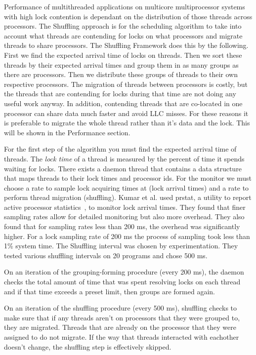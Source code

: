 \documentclass{sig-alternate}
\begin{document}
Performance of multithreaded applications on multicore multiprocessor systems with high lock contention is dependant on the distribution of those threads across processors. The Shuffling approach is for the scheduling algorithm to take into account what threads are contending for locks on what processors and migrate threads to share processors. The Shuffling Framework does this by the following. First we find the expected arrival time of locks on threads. Then we sort these threads by their expected arrival times and group them in as many groups as there are processors. Then we distribute these groups of threads to their own respective processors. The migration of threads between processors is costly, but the threads that are contending for locks during that time are not doing any useful work anyway. In addition, contending threads that are co-located in one processor can share data much faster and avoid LLC misses. For these reasons it is preferable to migrate the whole thread rather than it's data and the lock. This will be shown in the Performance section.~\cite{KumarEtal:2014}

For the first step of the algorithm you must find the expected arrival time of threads. The \textit{lock time} of a thread is measured by the percent of time it spends waiting for locks. There exists a daemon thread that contains a data structure that maps threads to their lock times and processor ids. For the monitor we must choose a rate to sample lock acquiring times at (lock arrival times) and a rate to perform thread migration (shuffling). Kumar et al. used prstat, a utility to report active processor statistics~\cite{prstat}, to monitor lock arrival times. They found that finer sampling rates allow for detailed monitoring but also more overhead. They also found that for sampling rates less than 200 ms, the overhead was significantly higher. For a lock sampling rate of 200 ms the process of sampling took less than 1\% system time. The Shuffling interval was chosen by experimentation. They tested various shuffling intervals on 20 programs and chose 500 ms.

On an iteration of the grouping-forming procedure (every 200 ms), the daemon checks the total amount of time that was spent resolving locks on each thread and if that time exceeds a preset limit, then groups are formed again.

On an iteration of the shuffling procedure (every 500 ms), shuffling checks to make sure that if any threads aren't on processors that they were grouped to, they are migrated. Threads that are already on the processor that they were assigned to do not migrate. If the way that threads interacted with eachother doesn't change, the shuffling step is effectively skipped.~\cite{KumarEtal:2014}
\end{document}

